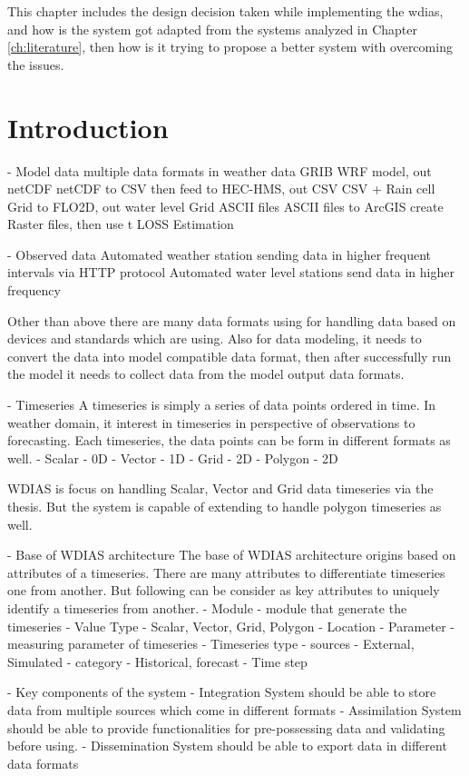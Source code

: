 This chapter includes the design decision taken while implementing the \acrfull{wdias}, and how is the system got adapted from the systems analyzed in Chapter \ref{ch:literature}, then how is it trying to propose a better system with overcoming the issues.

\section{Introduction}


- Model data
multiple data formats in weather data
GRIB WRF model, out netCDF
netCDF to CSV then feed to HEC-HMS, out CSV
CSV + Rain cell Grid to FLO2D, out water level Grid ASCII files
ASCII files to ArcGIS create Raster files, then use t LOSS Estimation

- Observed data
Automated weather station sending data in higher frequent intervals via HTTP protocol
Automated water level stations send data in higher frequency

Other than above there are many data formats using for handling data based on devices and standards which are using. Also for data modeling, it needs to convert the data into model compatible data format, then after successfully run the model it needs to collect data from the model output data formats.

- Timeseries
A timeseries is simply a series of data points ordered in time. In weather domain, it interest in timeseries in perspective of observations to forecasting.
Each timeseries, the data points can be form in different formats as well.
- Scalar - 0D
- Vector - 1D
- Grid - 2D
- Polygon - 2D

WDIAS is focus on handling Scalar, Vector and Grid data timeseries via the thesis. But the system is capable of extending to handle polygon timeseries as well.

- Base of WDIAS architecture
The base of WDIAS architecture origins based on attributes of a timeseries. There are many attributes to differentiate timeseries one from another. But following can be consider as key attributes to uniquely identify a timeseries from another.
- Module - module that generate the timeseries
- Value Type - Scalar, Vector, Grid, Polygon
- Location 
- Parameter - measuring parameter of timeseries
- Timeseries type
  - sources - External, Simulated
  - category - Historical, forecast
- Time step

- Key components of the system
- Integration
System should be able to store data from multiple sources which come in different formats
- Assimilation
System should be able to provide functionalities for pre-possessing data and validating before using. 
- Dissemination
System should be able to export data in different data formats